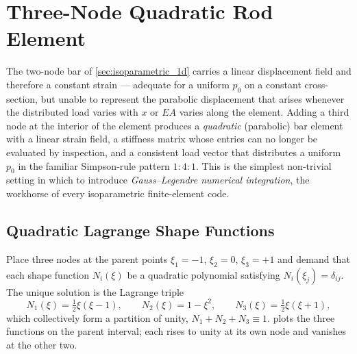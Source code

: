 \section{Three-Node Quadratic Rod Element}
\label{sec:bar_3node}

The two-node bar of \cref{sec:isoparametric_1d} carries a linear
displacement field and therefore a constant strain --- adequate for a
uniform $p_0$ on a constant cross-section, but unable to represent the
parabolic displacement that arises whenever the distributed load varies
with $x$ or $EA$ varies along the element. Adding a third node at the
interior of the element produces a \emph{quadratic} (parabolic) bar
element with a linear strain field, a stiffness matrix whose entries can
no longer be evaluated by inspection, and a consistent load vector that
distributes a uniform $p_0$ in the familiar Simpson-rule pattern $1{:}4{:}1$.
This is the simplest non-trivial setting in which to introduce
\emph{Gauss--Legendre numerical integration}, the workhorse of every
isoparametric finite-element code.

\subsection{Quadratic Lagrange Shape Functions}
\label{sec:bar_shape_quad}

Place three nodes at the parent points $\xi_1 = -1$, $\xi_2 = 0$,
$\xi_3 = +1$ and demand that each shape function $N_i(\xi)$ be a
quadratic polynomial satisfying $N_i(\xi_j) = \delta_{ij}$. The unique
solution is the Lagrange triple
\begin{equation}
    N_1(\xi) = \tfrac{1}{2}\xi(\xi-1), \qquad
    N_2(\xi) = 1 - \xi^2, \qquad
    N_3(\xi) = \tfrac{1}{2}\xi(\xi+1) ,
    \label{eq:bar_shape_quad}
\end{equation}
which collectively form a partition of unity, $N_1 + N_2 + N_3 \equiv 1$.
 plots the three functions on the parent
interval; each rises to unity at its own node and vanishes at the other
two.

